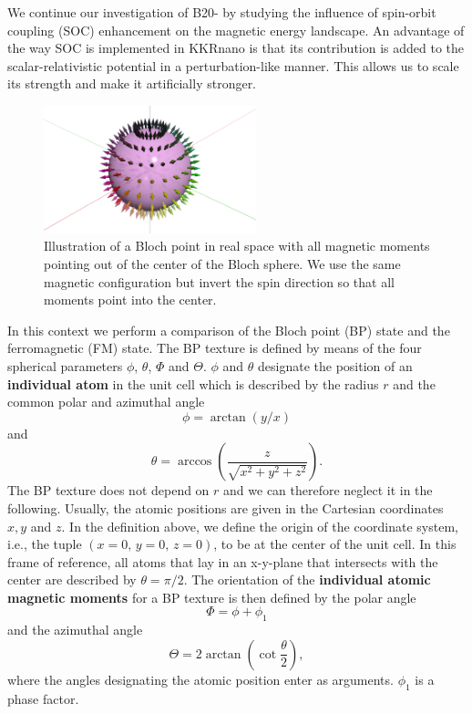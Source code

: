 \documentclass [a4paper, 12pt]{article}
\newcommand{\beq}{\begin{equation}}
\newcommand{\eeq}{\end{equation}}
\begin{document}
We continue our investigation of B20- by studying the influence of spin-orbit
coupling (SOC) enhancement on the magnetic energy landscape.
An advantage of the way SOC is implemented in KKRnano is that
its contribution is added to the scalar-relativistic
potential in a perturbation-like manner. This allows us to scale its strength and make it
artificially stronger.
\begin{figure}
	\includegraphics[width=0.55\textwidth]{Figures/blochpoint.eps}
	\caption{Illustration of a Bloch point in real space with all magnetic moments
	pointing out of the center of the Bloch sphere.
	We use the same magnetic configuration but invert the spin direction so that all moments point
	into the center.	}
	\label{fig:mnge_blochpoint}
\end{figure}
In this context we perform a comparison of the Bloch point (BP) state 
and the ferromagnetic (FM) state.
The BP texture is defined by means of the four spherical parameters $\phi$, $\theta$, 
$\Phi$ and $\Theta$.
$\phi$ and $\theta$ designate the position of an \textbf{individual atom} in the unit cell
which is described by the radius $r$ and the common polar and azimuthal angle
\beq
\phi = \arctan{\left(y/x\right)}
\eeq
and
\beq
\theta = \arccos{\left( \frac{z}{\sqrt{x^2+y^2+z^2}} \right)}.
\eeq
The BP texture does not depend on $r$ and we can therefore neglect it in the following.
Usually, the atomic positions are given in the Cartesian coordinates $x,y$ and $z$.
In the definition above, we define the origin of the coordinate system, i.e., the tuple $(x=0, \, y=0, \, z=0)$,
to be at the center of the unit cell.
In this frame of reference, all atoms that lay in an x-y-plane that intersects with the center
are described by $\theta=\pi/2$.
The orientation of the \textbf{individual atomic magnetic moments} for a BP texture is then defined 
by the polar angle
\beq
\Phi = \phi + \phi_{1}
\eeq
and the azimuthal angle
\beq
\Theta = 2 \arctan{\left(\cot{\frac{\theta}{2}} \right)},
\eeq
where the angles designating the atomic position enter as arguments. $\phi_{1}$ is a phase factor.
\end{document}
